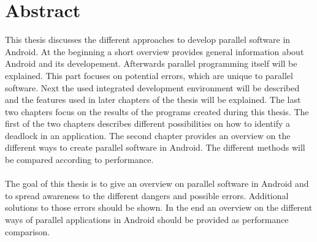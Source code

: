 \chapter[Abstract] {Abstract}       
\label{cha:abstract}

This thesis discusses the different approaches to develop parallel software in Android. At the beginning a short overview provides general information about Android and its developement. Afterwards parallel programming itself will be explained. This part focuses on potential errors, which are unique to parallel software. Next the used integrated development environment will be described and the features used in later chapters of the thesis will be explained. The last two chapters focus on the results of the programs created during this thesis. The first of the two chapters describes different possibilities on how to identify a deadlock in an application. The second chapter provides an overview on the different ways to create parallel software in Android. The different methods will be compared according to performance.
\\
\\
The goal of this thesis is to give an overview on parallel software in Android and to spread awareness to the different dangers and possible errors. Additional solutions to those errors should be shown. In the end an overview on the different ways of parallel applications in Android should be provided as performance comparison.

